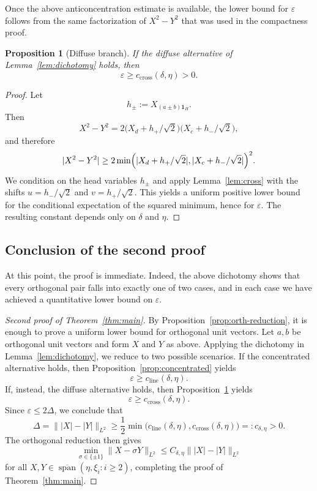 \documentclass[11pt]{amsart}
\numberwithin{equation}{section}
\newtheorem{proposition}[theorem]{Proposition}
\theoremstyle{definition}
\theoremstyle{remark}
\newcommand{\Span}{\operatorname{span}}
\newcommand{\eps}{\varepsilon}
\newcommand{\abs}[1]{\lvert #1 \rvert}
\newcommand{\norm}[1]{\lVert #1 \rVert}
\begin{document}
Once the above anticoncentration estimate is available, the lower bound for
$\eps$ follows from the same factorization of $X^2-Y^2$ that was
 used in the compactness proof.

\begin{proposition}[Diffuse branch]\label{prop:diffuse}
If the diffuse alternative of Lemma~\ref{lem:dichotomy} holds, then
\[
\eps\ge c_{\mathrm{cross}}(\delta,\eta)>0.
\]
\end{proposition}

\begin{proof}
Let
\[
h_\pm:=X_{(a\pm b)\mathbf 1_H}.
\]
Then
\[
X^2-Y^2
=2\bigl(X_d+h_+/\sqrt2\bigr)\bigl(X_c+h_-/\sqrt2\bigr),
\]
and therefore
\[
\abs{X^2-Y^2}
\ge
2\min\Bigl(\abs{X_d+h_+/\sqrt2},\abs{X_c+h_-/\sqrt2}\Bigr)^2.
\]
We condition on the head variables $h_\pm$ and apply Lemma~\ref{lem:cross} with
the shifts $u=h_-/\sqrt2$ and $v=h_+/\sqrt2$.  This yields a uniform positive
lower bound for the conditional expectation of the squared minimum, hence for
$\eps$.  The resulting constant depends only on $\delta$ and $\eta$.
\end{proof}

\subsection{Conclusion of the second proof}
At this point, the proof is immediate. Indeed, the above dichotomy shows that every
orthogonal pair falls into exactly one of two cases, and in each case we have
achieved a quantitative lower bound on $\eps$.

\begin{proof}[Second proof of Theorem~\ref{thm:main}]
By Proposition~\ref{prop:orth-reduction}, it is enough to prove a uniform
 lower bound for orthogonal unit vectors.  Let $a,b$ be orthogonal unit vectors and form $X$
and $Y$ as above.  Applying the dichotomy in Lemma~\ref{lem:dichotomy}, we reduce to two possible scenarios. 
If the concentrated alternative holds, then
Proposition~\ref{prop:concentrated} yields
\[
\eps\ge c_{\mathrm{line}}(\delta,\eta).
\]
If, instead, the diffuse alternative holds, then Proposition~\ref{prop:diffuse} yields
\[
\eps\ge c_{\mathrm{cross}}(\delta,\eta).
\]
Since $\eps\le 2\Delta$, we conclude that
\[
\Delta
=\norm{|X|-|Y|}_{L^2}
\ge
\frac12\min\bigl(c_{\mathrm{line}}(\delta,\eta),c_{\mathrm{cross}}(\delta,\eta)\bigr)
=:c_{\delta,\eta}>0.
\]
The orthogonal reduction then gives
\[
\min_{\sigma\in\{\pm1\}}\norm{X-\sigma Y}_{L^2}
\le C_{\delta,\eta}\norm{|X|-|Y|}_{L^2}
\]
for all $X,Y\in \overline{\Span}(\eta,\xi_i:i\ge2)$, completing the proof of
Theorem~\ref{thm:main}.
\end{proof}
\end{document}

